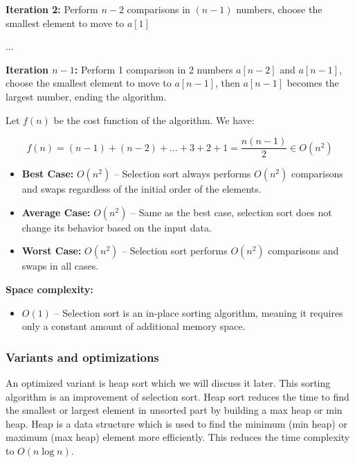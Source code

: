 \textbf{Iteration 2:} Perform $n - 2$ comparisons in $(n - 1)$ numbers, choose the smallest element to move to $a[1]$

...

\textbf{Iteration $n - 1$:} Perform 1 comparison in 2 numbers $a[n - 2]$ and $a[n - 1]$, choose the smallest element to move to $a[n - 1]$, then $a[n - 1]$ becomes the largest number, ending the algorithm.

Let $f(n)$ be the cost function of the algorithm. We have:

\[
f(n) = (n - 1) + (n - 2) + \ldots + 3 + 2 + 1 = \frac{n(n - 1)}{2} \in O(n^2)
\]
\begin{itemize}
    \item \textbf{Best Case:} $O(n^2)$ – Selection sort always performs $O(n^2)$ comparisons and swaps regardless of the initial order of the elements.
    \item \textbf{Average Case:} $O(n^2)$ – Same as the best case, selection sort does not change its behavior based on the input data.
    \item \textbf{Worst Case:} $O(n^2)$ – Selection sort performs $O(n^2)$ comparisons and swaps in all cases.
\end{itemize}

\textbf{Space complexity:}
\begin{itemize}
    \item $O(1)$ – Selection sort is an in-place sorting algorithm, meaning it requires only a constant amount of additional memory space.
\end{itemize}

\subsubsection{Variants and optimizations}

An optimized variant is heap sort which we will discuss it later. This sorting algorithm is an improvement of selection sort. Heap sort reduces the time to find the smallest or largest element in unsorted part by building a max heap or min heap. Heap is a data structure which is used to find the minimum (min heap) or maximum (max heap) element more efficiently. This reduces the time complexity to $O(n\log n)$.

\vspace{10pt}